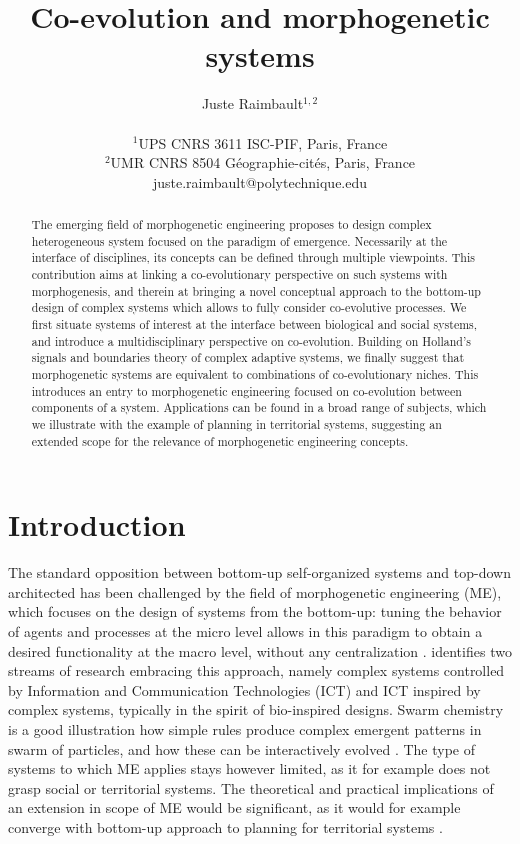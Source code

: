 \documentclass[letterpaper]{article}
\title{\vspace{-1cm}Co-evolution and morphogenetic systems}
\author{Juste Raimbault$^{1,2}$\\
\mbox{}\\
$^1$UPS CNRS 3611 ISC-PIF, Paris, France \\
$^2$UMR CNRS 8504 G{\'e}ographie-cit{\'e}s, Paris, France \\
juste.raimbault@polytechnique.edu} %
\date{}
\begin{document}
\maketitle


\begin{abstract}
The emerging field of morphogenetic engineering proposes to design complex heterogeneous system focused on the paradigm of emergence. Necessarily at the interface of disciplines, its concepts can be defined through multiple viewpoints. This contribution aims at linking a co-evolutionary perspective on such systems with morphogenesis, and therein at bringing a novel conceptual approach to the bottom-up design of complex systems which allows to fully consider co-evolutive processes. We first situate systems of interest at the interface between biological and social systems, and introduce a multidisciplinary perspective on co-evolution. Building on Holland's signals and boundaries theory of complex adaptive systems, we finally suggest that morphogenetic systems are equivalent to combinations of co-evolutionary niches. This introduces an entry to morphogenetic engineering focused on co-evolution between components of a system. Applications can be found in a broad range of subjects, which we illustrate with the example of planning in territorial systems, suggesting an extended scope for the relevance of morphogenetic engineering concepts.
\end{abstract}

\section{Introduction}


The standard opposition between bottom-up self-organized systems and top-down architected has been challenged by the field of morphogenetic engineering (ME), which focuses on the design of systems from the bottom-up: tuning the behavior of agents and processes at the micro level allows in this paradigm to obtain a desired functionality at the macro level, without any centralization \citep{doursat2013review}. \cite{doursat2011myriads} identifies two streams of research embracing this approach, namely complex systems controlled by Information and Communication Technologies (ICT) and ICT inspired by complex systems, typically in the spirit of bio-inspired designs. Swarm chemistry \citep{sayama2009swarm} is a good illustration how simple rules produce complex emergent patterns in swarm of particles, and how these can be interactively evolved \citep{sayama2009enhancing}. The type of systems to which ME applies stays however limited, as it for example does not grasp social or territorial systems. The theoretical and practical implications of an extension in scope of ME would be significant, as it would for example converge with bottom-up approach to planning for territorial systems \citep{batty2007cities}. 
\end{document}
